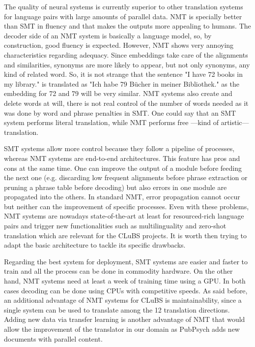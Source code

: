 \documentclass[a4paper,11pt]{article}
\begin{document}
The quality of neural systems is currently superior to other translation systems for language pairs with large amounts of parallel data.
NMT is specially better than SMT in fluency and that makes the outputs more appealing to humans. The decoder side of an NMT system is basically a language model, so, by construction, good fluency is expected. However, NMT shows very annoying characteristics regarding adequacy. Since embeddings take care of the alignments and similarities, synonyms are more likely to appear, but not only synonyms, any kind of related word. So, it is not strange that the sentence "I have 72 books in my library." is translated as "Ich habe 79 Bücher in meiner Bibliothek." as the embedding for 72 and 79 will be very similar. NMT systems also create and delete words at will, there is not real control of the number of words needed as it was done by word and phrase penalties in SMT. One could say that an SMT system performs literal translation, while NMT performs free ---kind of artistic--- translation.

SMT systems allow more control because they follow a pipeline of processes, whereas NMT systems are end-to-end architectures. This feature has pros and cons at the same time. One can improve the output of a module before feeding the next one (e.g. discarding low frequent alignments before phrase extraction or pruning a phrase table before decoding) but also errors in one module are propagated into the others. In standard NMT, error propagation cannot occur but neither can the improvement of specific processes. Even with these problems, NMT systems are nowadays state-of-the-art at least for resourced-rich language pairs and trigger new functionalities such as multilinguality and zero-shot translation which are relevant for the CLuBS projects. It is worth then trying to adapt the basic architecture to tackle its specific drawbacks.

Regarding the best system for deployment, SMT systems are easier and faster to train and all the process can be done in commodity hardware. On the other hand, NMT systems need at least a week of training time using a GPU. In both cases decoding can be done using CPUs with competitive speeds. As said before, an additional advantage of NMT systems for CLuBS is maintainability, since a single system can be used to translate among the 12 translation directions. Adding new data via transfer learning is another advantage of NMT that would allow the improvement of the translator in our domain as PubPsych adds new documents with parallel content.
\end{document}
